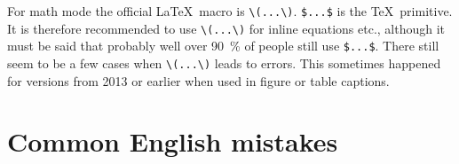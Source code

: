 For math mode the official \LaTeX\ macro is \verb|\(...\)|.
\verb|$...$| is the \TeX\ primitive.
It is therefore recommended to use \verb|\(...\)| for inline equations etc.,
although it must be said that probably well over \qty{90}{\%} of people still use \verb|$...$|.
There still seem to be a few cases when \verb|\(...\)| leads to errors.
This sometimes happened for \TeXLive versions from 2013 or earlier
when used in figure or table captions.


\section{Common English mistakes}%
\label{sec:tips:english}


